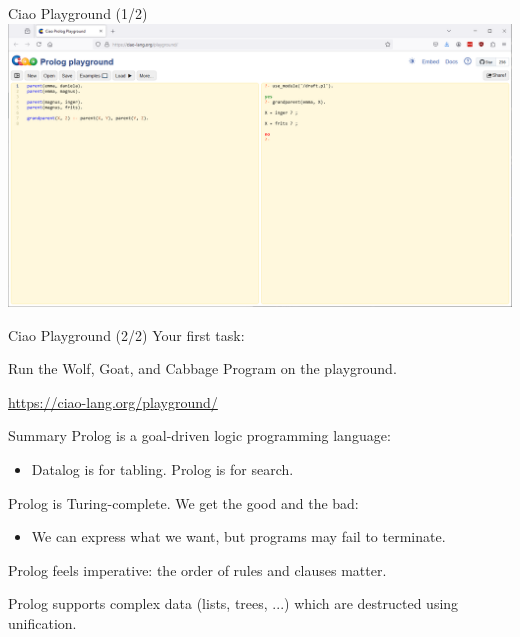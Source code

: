 \begin{frame}{Ciao Playground (1/2)}
\includegraphics[width=\textwidth]{img/ciao-playground.png}
\end{frame}

\begin{frame}{Ciao Playground (2/2)}
Your first task:

\Large
Run the Wolf, Goat, and Cabbage Program on the playground.

\bigskip

\centering
{\Large \url{https://ciao-lang.org/playground/}}
\end{frame}

\begin{frame}{Summary}
Prolog is a goal-driven logic programming language:
%
\begin{itemize}
    \item Datalog is for tabling. Prolog is for search. 
\end{itemize}

Prolog is Turing-complete. We get the good and the bad: 
%
\begin{itemize}
    \item We can express what we want, but programs may fail to terminate.
\end{itemize}

Prolog feels imperative: the order of rules and clauses matter. 

Prolog supports complex data (lists, trees, ...) which are destructed using unification. 
\end{frame}
    
\begin{frame}[standout]
\end{frame}


